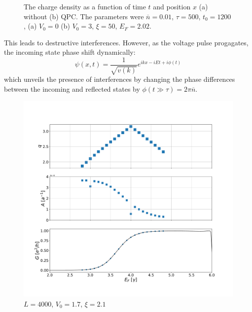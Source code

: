 \documentclass[aps,prl,preprint,groupedaddress]{revtex4-1}
\begin{document}
\begin{figure}[!h]
	\centering
	\qquad
	\caption{The charge density as a function of time $t$ and position $x$ (a) without (b) QPC. The parameters were $\overline{n} =0.01$, $\tau = 500$, $t_0 =1200$, (a) $V_0 = 0$ (b) $V_0 = 3$, $\xi = 50$, $E_F =2.02$.}
	
	\label{fig:density_comp_reflec}%
\end{figure}



This leads to destructive interferences. However, as the voltage pulse progagates, the incoming state phase shift dynamically:
\begin{equation}
\psi(x,t) =  \frac{1}{\sqrt{v(k)}} e^{ikx - iEt + i\phi(t)}
\end{equation}
which unveils the presence of interferences by changing the phase differences between the incoming and reflected states by $\phi(t\gg \tau) = 2\pi \overline{n}$.


\begin{figure}
	\centering
	\includegraphics[width=0.7\linewidth]{../figures/G_AMP_Q}
	\caption{$L =4000$, $V_0 = 1.7$, $\xi = 2.1$}
	\label{fig:gampq}
\end{figure}
\end{document}
